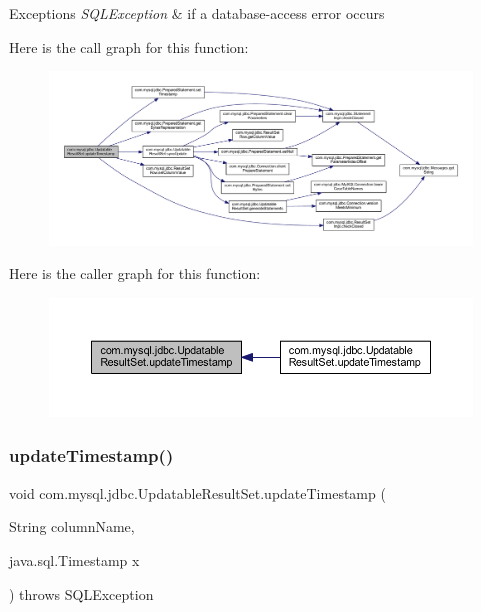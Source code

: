 \begin{DoxyExceptions}{Exceptions}
{\em S\+Q\+L\+Exception} & if a database-\/access error occurs \\
\hline
\end{DoxyExceptions}
Here is the call graph for this function\+:
\nopagebreak
\begin{figure}[H]
\begin{center}
\leavevmode
\includegraphics[width=350pt]{classcom_1_1mysql_1_1jdbc_1_1_updatable_result_set_ac64644e427b3351770c30753ad0d9bbd_cgraph}
\end{center}
\end{figure}
Here is the caller graph for this function\+:
\nopagebreak
\begin{figure}[H]
\begin{center}
\leavevmode
\includegraphics[width=350pt]{classcom_1_1mysql_1_1jdbc_1_1_updatable_result_set_ac64644e427b3351770c30753ad0d9bbd_icgraph}
\end{center}
\end{figure}
\mbox{\label{classcom_1_1mysql_1_1jdbc_1_1_updatable_result_set_a76ddad6df768c73381a9cdb2797aeba4}} 
\subsubsection{\texorpdfstring{update\+Timestamp()}{updateTimestamp()}\hspace{0.1cm}{\footnotesize\ttfamily [2/2]}}
{\footnotesize\ttfamily void com.\+mysql.\+jdbc.\+Updatable\+Result\+Set.\+update\+Timestamp (\begin{DoxyParamCaption}\item[{String}]{column\+Name,  }\item[{java.\+sql.\+Timestamp}]{x }\end{DoxyParamCaption}) throws S\+Q\+L\+Exception}

